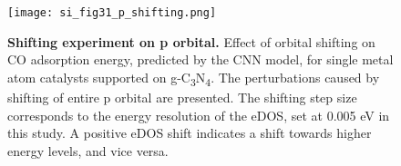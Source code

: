 \begin{figure}[htbp]
  \centering
  \texttt{[image: si\_fig31\_p\_shifting.png]}
  \caption{\textbf{Shifting experiment on p orbital.}
  Effect of orbital shifting on CO adsorption energy, predicted by the CNN model,
  for single metal atom catalysts supported on g-C\textsubscript{3}N\textsubscript{4}.
  The perturbations caused by shifting of entire p orbital are presented.
  The shifting step size corresponds to the energy resolution of the eDOS, set at 0.005 eV in this study.
  A positive eDOS shift indicates a shift towards higher energy levels, and vice versa.}
  \label{si_fig31:p_shifting}
\end{figure}
